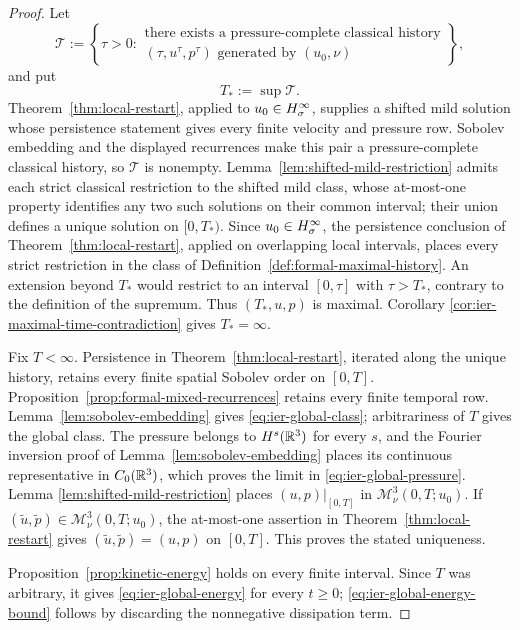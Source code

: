 \begin{proof}
 Let
 \[
  \mathscr T:=\left\{\tau>0:
  \begin{array}{c}
  \text{there exists a pressure-complete classical history}\\
  (\tau,u^\tau,p^\tau)\text{ generated by }(u_0,\nu)
  \end{array}
  \right\},
 \]
 and put
\[
 T_*:=\sup\mathscr T.
\]
 Theorem~\ref{thm:local-restart}, applied to \(u_0\in H^\infty_\sigma\), supplies a
 shifted mild solution whose persistence statement gives every finite
 velocity and pressure row.  Sobolev embedding and the displayed recurrences
 make this pair a pressure-complete classical history, so \(\mathscr T\) is
 nonempty.
 Lemma~\ref{lem:shifted-mild-restriction} admits each strict classical
restriction to the shifted mild class, whose at-most-one property identifies
any two such solutions on their common interval; their union defines a unique
 solution on \([0,T_*)\).  Since \(u_0\in H^\infty_\sigma\), the persistence conclusion
of Theorem~\ref{thm:local-restart}, applied on overlapping local intervals,
places every strict restriction in the class of
Definition~\ref{def:formal-maximal-history}.  An extension beyond \(T_*\)
would restrict to an interval \([0,\tau]\) with \(\tau>T_*\), contrary to
the definition of the supremum.  Thus \((T_*,u,p)\) is maximal.  Corollary
\ref{cor:ier-maximal-time-contradiction} gives \(T_*=\infty\).

Fix \(T<\infty\).  Persistence in Theorem~\ref{thm:local-restart}, iterated
along the unique history, retains every finite spatial Sobolev order on
\([0,T]\).  Proposition~\ref{prop:formal-mixed-recurrences} retains every
finite temporal row.  Lemma~\ref{lem:sobolev-embedding} gives
\eqref{eq:ier-global-class}; arbitrariness of \(T\) gives the global class.
The pressure belongs to \(H^s(\mathbb R^3)\) for every \(s\), and the Fourier
inversion proof of Lemma~\ref{lem:sobolev-embedding} places its continuous
representative in \(C_0(\mathbb R^3)\), which proves the limit in
\eqref{eq:ier-global-pressure}.  Lemma
\ref{lem:shifted-mild-restriction} places \((u,p)|_{[0,T]}\) in
\(\mathscr M_\nu^3(0,T;u_0)\).  If
\((\widetilde u,\widetilde p)\in\mathscr M_\nu^3(0,T;u_0)\), the at-most-one
assertion in Theorem~\ref{thm:local-restart} gives
\((\widetilde u,\widetilde p)=(u,p)\) on \([0,T]\).  This proves the stated
uniqueness.

Proposition~\ref{prop:kinetic-energy} holds on every finite interval.  Since
\(T\) was arbitrary, it gives \eqref{eq:ier-global-energy} for every
\(t\ge0\); \eqref{eq:ier-global-energy-bound} follows by discarding the
nonnegative dissipation term.
\end{proof}
